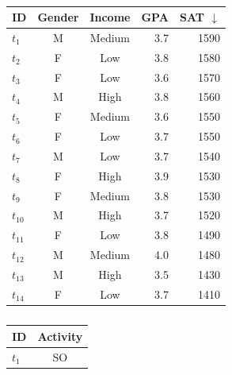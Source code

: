 \begin{table}[ht]
\begin{minipage}{0.6\linewidth}
        \centering
		\caption{\candidates{}}
		\label{tab:candidates}
        \footnotesize
		\begin{tabular}{lccrr}
		\hline
		\textbf{ID} & \textbf{Gender} & \textbf{Income} & \textbf{GPA} & \textbf{SAT $\downarrow$} \\ \hline
		$t_1$           & M               & Medium         & 3.7      & 1590 \\    
		$t_2$           & F               & Low         & 3.8      & 1580 \\    
		$t_3$           & F               & Low         & 3.6      & 1570 \\    
		$t_4$           & M               & High         & 3.8      & 1560 \\    
		$t_5$           & F               & Medium         & 3.6      & 1550 \\    
		$t_6$           & F               & Low         & 3.7      & 1550 \\    
		$t_7$           & M               & Low         & 3.7      & 1540 \\    
		$t_8$           & F               & High         & 3.9      & 1530 \\    
		$t_9$           & F               & Medium         & 3.8      & 1530 \\    
		$t_{10}$           & M               & High         & 3.7      & 1520 \\    
		$t_{11}$           & F               & Low         & 3.8      & 1490 \\    
		$t_{12}$           & M               & Medium         & 4.0      & 1480 \\    
		$t_{13}$           & M               & High         & 3.5      & 1430 \\  
  	$t_{14}$           & F               & Low         & 3.7      & 1410 \\  
		\end{tabular}
\end{minipage}
\hfill
\begin{minipage}{.35\linewidth}
    \centering
    \caption{\internships{}}
    \label{tab:internships}
    \footnotesize
    \begin{tabular}{lc}
    \hline
    \textbf{ID} & \textbf{Activity} \\ \hline
        $t_{1}$            & SO        \\  

\end{tabular}
\end{minipage}
\end{table}
